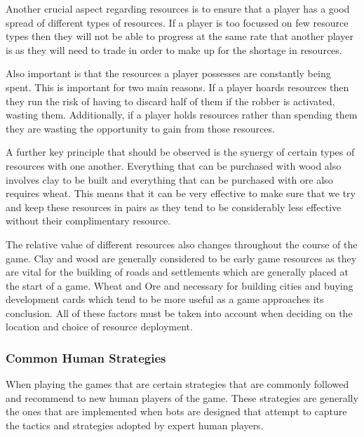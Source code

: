\documentclass[]{article}
\begin{document}
\par Another crucial aspect regarding resources is to ensure that a player has a good spread of different types of resources. If a player is too focussed on few resource types then they will not be able to progress at the same rate that another player is as they will need to trade in order to make up for the shortage in resources.

\par Also important is that the resources a player possesses are constantly being spent. This is important for two main reasons. If a player hoards resources then they run the risk of having to discard half of them if the robber is activated, wasting them. Additionally, if a player holds resources rather than spending them they are wasting the opportunity to gain from those resources. 

\par A further key principle that should be observed is the synergy of certain types of resources with one another. Everything that can be purchased with wood also involves clay to be built and everything that can be purchased with ore also requires wheat. This means that it can be very effective to make sure that we try and keep these resources in pairs as they tend to be considerably less effective without their complimentary resource.

\par The relative value of different resources also changes throughout the course of the game. Clay and wood are generally considered to be early game resources as they are vital for the building of roads and settlements which are generally placed at the start of a game. Wheat and Ore and necessary for building cities and buying development cards which tend to be more useful as a game approaches its conclusion. All of these factors must be taken into account when deciding on the location and choice of resource deployment.

\subsubsection{Common Human Strategies}
When playing the games that are certain strategies that are commonly followed and recommend to new human players of the game. These strategies are generally the ones that are implemented when bots are designed that attempt to capture the tactics and strategies adopted by expert human players.
\end{document}
